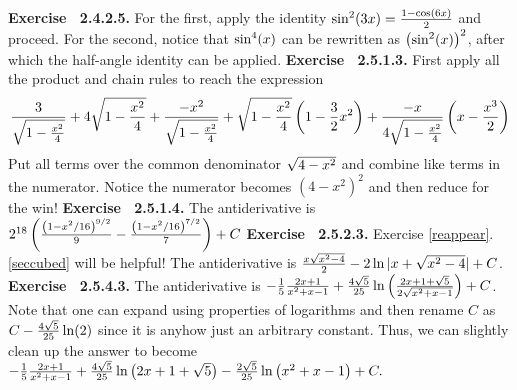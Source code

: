  {\noindent \protect \bf  Exercise ~2.4.2.5.} For the first, apply the identity $\protect \qopname  \relax o{sin}^2(3x)=\protect \frac  {1-\protect \qopname  \relax o{cos}(6x)}{2}$ and proceed. For the second, notice that $\protect \qopname  \relax o{sin}^4(x)$ can be rewritten as $\left (\protect \qopname  \relax o{sin}^2(x)\right )^2$, after which the half-angle identity can be applied. \protect \newline  \protect \newline  
 {\noindent \protect \bf  Exercise ~2.5.1.3.} First apply all the product and chain rules to reach the expression $$\protect \frac  {3}{\protect \sqrt  {1-\protect \frac  {x^2}{4}}}+4\protect \sqrt  {1-\protect \frac  {x^2}{4}}+\protect \frac  {-x^2}{\protect \sqrt  {1-\protect \frac  {x^2}{4}}}+\protect \sqrt  {1-\protect \frac  {x^2}{4}}\left (1-\protect \frac  {3}{2}x^2\right )+\protect \frac  {-x}{4\protect \sqrt  {1-\protect \frac  {x^2}{4}}}\left (x-\protect \frac  {x^3}{2}\right ) $$ Put all terms over the common denominator $\protect \sqrt  {4-x^2}$ and combine like terms in the numerator. Notice the numerator becomes $\left (4-x^2\right )^2$ and then reduce for the win! \protect \newline  \protect \newline  
 {\noindent \protect \bf  Exercise ~2.5.1.4.} The antiderivative is $2^{18}\left (\protect \frac  {\left (1-x^2/16\right )^{9/2}}{9}-\protect \frac  {\left (1-x^2/16\right )^{7/2}}{7}\right )+C$ \protect \newline  \protect \newline  
 {\noindent \protect \bf  Exercise ~2.5.2.3.} Exercise \protect \ref  {reappear}.\protect \ref  {seccubed} will be helpful! The antiderivative is $\protect \frac  {x\protect \sqrt  {x^2-4}}{2}-2\protect \qopname  \relax o{ln}|x+\protect \sqrt  {x^2-4}|+C$. \protect \newline  \protect \newline  
 {\noindent \protect \bf  Exercise ~2.5.4.3.} The antiderivative is $-\protect \frac  {1}{5}\protect \frac  {2x+1}{x^2+x-1}+\protect \frac  {4\protect \sqrt  {5}}{25}\protect \qopname  \relax o{ln}\left (\protect \frac  {2x+1+\protect \sqrt  {5}}{2\protect \sqrt  {x^2+x-1}}\right )+C$. Note that one can expand using properties of logarithms and then rename $C$ as $C-\protect \frac  {4\protect \sqrt  {5}}{25}\protect \qopname  \relax o{ln}(2)$ since it is anyhow just an arbitrary constant. Thus, we can slightly clean up the answer to become $-\protect \frac  {1}{5}\protect \frac  {2x+1}{x^2+x-1}+\protect \frac  {4\protect \sqrt  {5}}{25}\protect \qopname  \relax o{ln}\left (2x+1+\protect \sqrt  {5}\right )-\protect \frac  {2\protect \sqrt  {5}}{25}\protect \qopname  \relax o{ln}\left (x^2+x-1\right )+C.$ \protect \newline  \protect \newline  
